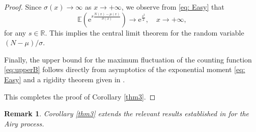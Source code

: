 \documentclass[11pt,a4paper]{article}
\newtheorem{rem}[thm]{Remark}
\numberwithin{equation}{section}
\begin{document}
\begin{proof}
Since  $\sigma(x)\to\infty$ as $x\to +\infty$, we observe from \eqref{eq: Easy} that
\begin{equation}\label{eq: CTL}
\mathbb{E}\left(\mathrm{e}^{s\frac{N(x)-\mu(x)}{\sigma(x)}}\right)\to \mathrm{e}^{\frac{s^2}{2}}, \quad x\to+\infty,
\end{equation}
for any $s\in\mathbb{R}$. This implies the central limit theorem for the random variable $(N-\mu)/\sigma$.

Finally, the upper bound for the maximum fluctuation of the counting function \eqref{eq:upperB} follows directly from asymptotics of the exponential moment \eqref{eq: Easy}  and a rigidity theorem given in \cite[Theorem 1.2]{CC2021}.

This completes the proof of Corollary \ref{thm3}.
\end{proof}

\begin{rem}
Corollary \ref{thm3} extends the relevant results established in \cite{CC2021,Sosa} for the Airy process.
\end{rem}
\end{document}
